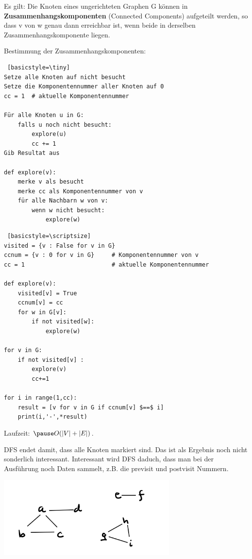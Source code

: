 \begin{frame}[fragile]
Es gilt: Die Knoten eines ungerichteten Graphen G können in \textbf{Zusammenhangskomponenten} (Connected Components) aufgeteilt werden, so dass v von w genau dann erreichbar ist, wenn beide in derselben Zusammenhangskomponente liegen.

Bestimmung der Zusammenhangskomponenten:  

\begin{lstlisting} [basicstyle=\tiny]
Setze alle Knoten auf nicht besucht
Setze die Komponentennummer aller Knoten auf 0
cc = 1  # aktuelle Komponentennummer

Für alle Knoten u in G:
    falls u noch nicht besucht:
        explore(u)
        cc += 1
Gib Resultat aus 

def explore(v):
    merke v als besucht
    merke cc als Komponentennummer von v
    für alle Nachbarn w von v:
        wenn w nicht besucht:
            explore(w)

\end{lstlisting} 

\end{frame}

\begin{frame}[fragile]

\begin{lstlisting} [basicstyle=\scriptsize]
visited = {v : False for v in G}  
ccnum = {v : 0 for v in G}     # Komponentennummer von v
cc = 1                         # aktuelle Komponentennummer    

def explore(v):
    visited[v] = True
    ccnum[v] = cc
    for w in G[v]:
        if not visited[w]:
            explore(w)   

for v in G:
    if not visited[v] :
        explore(v)
        cc+=1 
      
for i in range(1,cc):
    result = [v for v in G if ccnum[v] $==$ i]   
    print(i,'-',*result)
\end{lstlisting} 

Laufzeit: $\pause O(\left|V\right|+\left|E\right|)$.
\end{frame}

\begin{frame}[fragile]
DFS endet damit, dass alle Knoten markiert sind. Das ist
als Ergebnis noch nicht sonderlich interessant. Interessant wird 
DFS daduch, dass man bei der Ausführung noch Daten sammelt, z.B. die previsit und postvisit Nummern.

\includegraphics[width=9cm]{bild7.png}

\end{frame}

